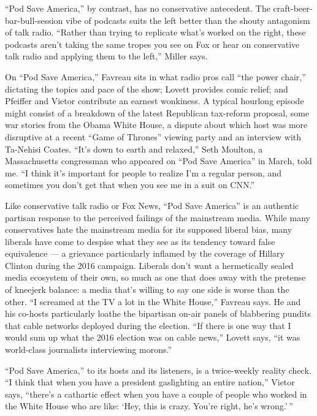 ``Pod Save America,'' by contrast, has no conservative antecedent. The
craft-beer-bar-bull-session vibe of podcasts suits the left better than
the shouty antagonism of talk radio. ``Rather than trying to replicate
what's worked on the right, these podcasts aren't taking the same tropes
you see on Fox or hear on conservative talk radio and applying them to
the left,'' Miller says.

On ``Pod Save America,'' Favreau sits in what radio pros call ``the
power chair,'' dictating the topics and pace of the show; Lovett
provides comic relief; and Pfeiffer and Vietor contribute an earnest
wonkiness. A typical hourlong episode might consist of a breakdown of
the latest Republican tax-reform proposal, some war stories from the
Obama White House, a dispute about which host was more disruptive at a
recent ``Game of Thrones'' viewing party and an interview with Ta-Nehisi
Coates. ``It's down to earth and relaxed,'' Seth Moulton, a
Massachusetts congressman who appeared on ``Pod Save America'' in March,
told me. ``I think it's important for people to realize I'm a regular
person, and sometimes you don't get that when you see me in a suit on
CNN.''

Like conservative talk radio or Fox News, ``Pod Save America'' is an
authentic partisan response to the perceived failings of the mainstream
media. While many conservatives hate the mainstream media for its
supposed liberal bias, many liberals have come to despise what they see
as its tendency toward false equivalence --- a grievance particularly
inflamed by the coverage of Hillary Clinton during the 2016 campaign.
Liberals don't want a hermetically sealed media ecosystem of their own,
so much as one that does away with the pretense of kneejerk balance: a
media that's willing to say one side is worse than the other. ``I
screamed at the TV a lot in the White House,'' Favreau says. He and his
co-hosts particularly loathe the bipartisan on-air panels of blabbering
pundits that cable networks deployed during the election. ``If there is
one way that I would sum up what the 2016 election was on cable news,''
Lovett says, ``it was world-class journalists interviewing morons.''

``Pod Save America,'' to its hosts and its listeners, is a twice-weekly
reality check. ``I think that when you have a president gaslighting an
entire nation,'' Vietor says, ``there's a cathartic effect when you have
a couple of people who worked in the White House who are like: `Hey,
this is crazy. You're right, he's wrong.' ''

